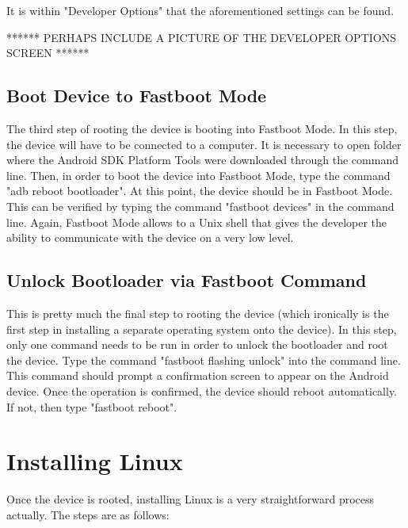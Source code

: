 It is within "Developer Options" that the aforementioned settings can be found.

****** PERHAPS INCLUDE A PICTURE OF THE DEVELOPER OPTIONS SCREEN ******

\subsection{Boot Device to Fastboot Mode}
The third step of rooting the device is booting into Fastboot Mode. In this step, the device will have to be connected to a computer. It is necessary to 
open folder where the Android SDK Platform Tools were downloaded through the command line. Then, in order to boot the device into Fastboot Mode, type the command
"adb reboot bootloader". At this point, the device should be in Fastboot Mode. This can be verified by typing the command "fastboot devices" in the command line.
Again, Fastboot Mode allows to a Unix shell that gives the developer the ability to communicate with the device on a very low level.

\subsection{Unlock Bootloader via Fastboot Command}
This is pretty much the final step to rooting the device (which ironically is the first step in installing a separate operating system onto the device). In this 
step, only one command needs to be run in order to unlock the bootloader and root the device. Type the command "fastboot flashing unlock" into the command line. 
This command should prompt a confirmation screen to appear on the Android device. Once the operation is confirmed, the device should reboot automatically. If not, 
then type "fastboot reboot".

\section{Installing Linux}
Once the device is rooted, installing Linux is a very straightforward process actually. The steps are as follows:

